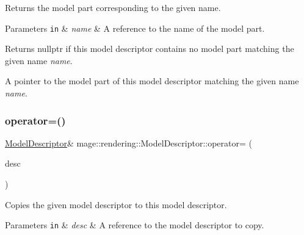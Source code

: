 Returns the model part corresponding to the given name.


\begin{DoxyParams}[1]{Parameters}
\mbox{\tt in}  & {\em name} & A reference to the name of the model part. \\
\hline
\end{DoxyParams}
\begin{DoxyReturn}{Returns}
{\ttfamily nullptr} if this model descriptor contains no model part matching the given name {\itshape name}. 

A pointer to the model part of this model descriptor matching the given name {\itshape name}. 
\end{DoxyReturn}
\hypertarget{classmage_1_1rendering_1_1_model_descriptor_a6d27a72aa2ebffbe4e7f2635f803dd72}{}\label{classmage_1_1rendering_1_1_model_descriptor_a6d27a72aa2ebffbe4e7f2635f803dd72} 
\subsubsection{\texorpdfstring{operator=()}{operator=()}\hspace{0.1cm}{\footnotesize\ttfamily [1/2]}}
{\footnotesize\ttfamily \hyperlink{classmage_1_1rendering_1_1_model_descriptor}{Model\+Descriptor}\& mage\+::rendering\+::\+Model\+Descriptor\+::operator= (\begin{DoxyParamCaption}\item[{const \hyperlink{classmage_1_1rendering_1_1_model_descriptor}{Model\+Descriptor} \&}]{desc }\end{DoxyParamCaption})\hspace{0.3cm}{\ttfamily [delete]}}

Copies the given model descriptor to this model descriptor.


\begin{DoxyParams}[1]{Parameters}
\mbox{\tt in}  & {\em desc} & A reference to the model descriptor to copy. \\
\hline
\end{DoxyParams}
\hypertarget{classmage_1_1rendering_1_1_model_descriptor_a52e9fbf292efc7a803d367bb3b6cb962}{}\label{classmage_1_1rendering_1_1_model_descriptor_a52e9fbf292efc7a803d367bb3b6cb962} 
